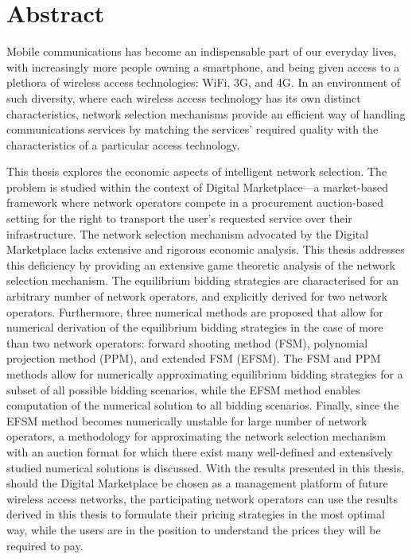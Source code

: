 \chapter*{Abstract} %
\label{cha:abstract}

Mobile communications has become an indispensable part of our everyday lives, with increasingly more people owning a smartphone, and being given access to a plethora of wireless access technologies: WiFi, 3G, and 4G. In an environment of such diversity, where each wireless access technology has its own distinct characteristics, network selection mechanisms provide an efficient way of handling communications services by matching the services' required quality with the characteristics of a particular access technology.

This thesis explores the economic aspects of intelligent network selection. The problem is studied within the context of Digital Marketplace---a market-based framework where network operators compete in a procurement auction-based setting for the right to transport the user's requested service over their infrastructure. The network selection mechanism advocated by the Digital Marketplace lacks extensive and rigorous economic analysis. This thesis addresses this deficiency by providing an extensive game theoretic analysis of the network selection mechanism. The equilibrium bidding strategies are characterised for an arbitrary number of network operators, and explicitly derived for two network operators. Furthermore, three numerical methods are proposed that allow for numerical derivation of the equilibrium bidding strategies in the case of more than two network operators: forward shooting method (FSM), polynomial projection method (PPM), and extended FSM (EFSM). The FSM and PPM methods allow for numerically approximating equilibrium bidding strategies for a subset of all possible bidding scenarios, while the EFSM method enables computation of the numerical solution to all bidding scenarios. Finally, since the EFSM method becomes numerically unstable for large number of network operators, a methodology for approximating the network selection mechanism with an auction format for which there exist many well-defined and extensively studied numerical solutions is discussed. With the results presented in this thesis, should the Digital Marketplace be chosen as a management platform of future wireless access networks, the participating network operators can use the results derived in this thesis to formulate their pricing strategies in the most optimal way, while the users are in the position to understand the prices they will be required to pay.
